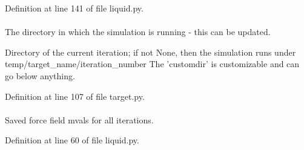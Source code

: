 \-Definition at line 141 of file liquid.\-py.

\hypertarget{classforcebalance_1_1target_1_1Target_a1da470037ef61c22dc44beb85cfa01a9}{
\paragraph[{rundir}]{}}\label{classforcebalance_1_1target_1_1Target_a1da470037ef61c22dc44beb85cfa01a9}


\-The directory in which the simulation is running -\/ this can be updated. 

\-Directory of the current iteration; if not \-None, then the simulation runs under temp/target\-\_\-name/iteration\-\_\-number \-The 'customdir' is customizable and can go below anything.

\-Definition at line 107 of file target.\-py.

\hypertarget{classforcebalance_1_1liquid_1_1Liquid_a110998789cb046248b78318c97872930}{
\paragraph[{\-Saved\-M\-Val}]{}}\label{classforcebalance_1_1liquid_1_1Liquid_a110998789cb046248b78318c97872930}


\-Saved force field mvals for all iterations. 



\-Definition at line 60 of file liquid.\-py.

\hypertarget{classforcebalance_1_1liquid_1_1Liquid_acab3a497d408af6d152a460ecba40583}{
\paragraph[{\-Saved\-Traj}]{}}\label{classforcebalance_1_1liquid_1_1Liquid_acab3a497d408af6d152a460ecba40583}


